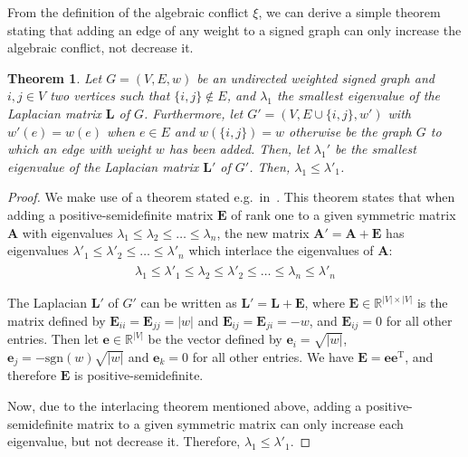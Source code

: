 \documentclass[11pt,a4paper]{book}
\newtheorem{theorem}{Theorem}
\begin{document}
From the definition of the algebraic conflict $\xi$, we can derive a
simple theorem stating that adding an edge of any weight to a signed
graph can only increase the algebraic conflict, not decrease it. 
\begin{theorem}
  Let $G = (V, E, w)$ be an undirected weighted signed graph and $i,j\in V$ two vertices
  such that $\{i,j\} \notin E$, and $\lambda_1$ the smallest eigenvalue
  of the Laplacian matrix $\mathbf L$ of $G$.
  Furthermore, let $G' = (V, E \cup \{i,j\}, w')$ with
  $w'(e)=w(e)$ when $e\in E$ and $w(\{i,j\})=w$ otherwise be the graph $G$ to
  which an edge with weight $w$ has been added. 
  Then, let $\lambda_1'$ be
  the smallest eigenvalue of the Laplacian matrix $\mathbf L'$ of
  $G'$. Then, $\lambda_1^{\phantom '} \leq \lambda'_1$. 
\end{theorem}
\begin{proof}
  We make use of a theorem stated e.g.\ in~\cite[p.~97]{b663}.  This
  theorem states that when adding a 
  positive-semidefinite matrix $\mathbf E$ of rank one to a given
  symmetric matrix $\mathbf A$ 
  with eigenvalues $\lambda_1 \leq \lambda_2 \leq \ldots \leq
  \lambda_n$, the new matrix $\mathbf A' = \mathbf A + \mathbf E$ has
  eigenvalues $\lambda'_1 \leq \lambda'_2 \leq \ldots \leq
  \lambda'_n$ which interlace the eigenvalues of $\mathbf A$:
  \begin{align*}
    \lambda_1^{\phantom '} \leq \lambda'_1 \leq \lambda_2^{\phantom '} \leq \lambda'_2 \leq \ldots 
    \leq \lambda_n^{\phantom '} \leq \lambda'_n
  \end{align*}

  The Laplacian $\mathbf L'$ of $G'$ can be written as $\mathbf L' =
  \mathbf L + \mathbf E$, where $\mathbf E \in \mathbb R^{|V| \times
    |V|}$ is the matrix defined by  
  $\mathbf E_{ii}=\mathbf E_{jj} = |w|$ and $\mathbf E_{ij}=\mathbf E_{ji}
  = -w$, and $\mathbf E_{ij} = 0 $ for all other entries. 
  Then let $\mathbf e \in \mathbb R^{|V|}$ be the vector defined by
  $\mathbf e_i = \sqrt{|w|}$, $\mathbf e_j = -\mathrm{sgn}(w)\sqrt{|w|}$
  and $\mathbf e_k = 0$ for all other entries.  We have $\mathbf E =
  \mathbf e \mathbf e^{\mathrm T}$, and therefore $\mathbf E$ is
  positive-semidefinite.  

  Now, due to the interlacing theorem mentioned above, adding a
  positive-semidefinite matrix to a given symmetric matrix can only
  increase each eigenvalue, but not decrease it.  Therefore, $\lambda_1
  \leq \lambda'_1$. 
\end{proof}
\end{document}
